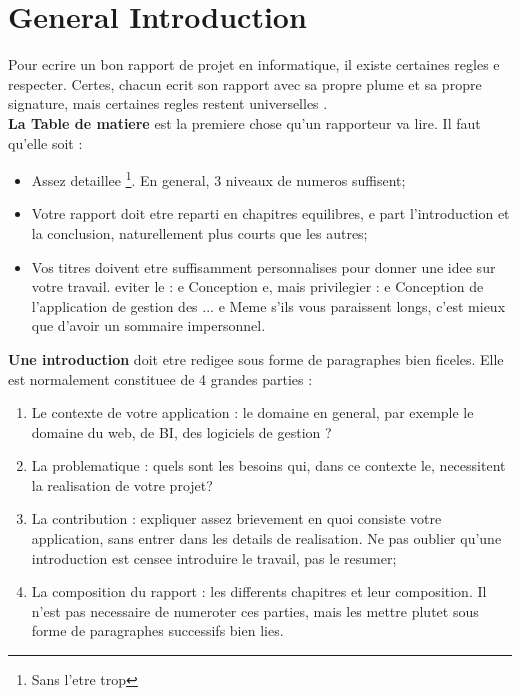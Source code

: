 \chapter*{General Introduction}

\begin{spacing}{1.2}

Pour ecrire un bon rapport \cite{SFAXI2015} de projet en informatique, il existe certaines regles e respecter. Certes, chacun ecrit son rapport avec sa propre plume et sa propre signature, mais certaines regles restent universelles    \cite{Latex}.\\

\textbf{La Table de matiere} est la premiere chose qu'un rapporteur va lire. Il faut qu'elle soit :
\begin{itemize}
\item Assez detaillee \footnote{Sans l'etre trop}. En general, 3 niveaux de numeros suffisent;
\item Votre rapport doit etre reparti en chapitres equilibres, e part l'introduction et la conclusion, naturellement plus courts que les autres;
\item Vos titres doivent etre suffisamment personnalises pour donner une idee sur votre travail. eviter le : e Conception e,  mais privilegier : e Conception de l'application de gestion des $...$ e Meme s'ils vous paraissent longs, c'est mieux que 
d'avoir un sommaire impersonnel. \\
\end{itemize}

\textbf{Une introduction} doit etre redigee sous forme de paragraphes bien ficeles. Elle est
normalement constituee de 4 grandes parties :
\begin{enumerate}
\item Le contexte de votre application : le domaine en general, par exemple le domaine du web, de BI, des logiciels de gestion ?
\item La problematique : quels sont les besoins qui, dans ce contexte le, necessitent la realisation de votre projet?
\item La contribution : expliquer assez brievement en quoi consiste votre application, sans entrer dans les details de realisation. Ne pas oublier qu'une introduction est
 censee introduire le travail, pas le resumer; 
 \item La composition du rapport : les differents chapitres et leur composition. Il n'est pas necessaire de numeroter ces parties, mais les mettre plutet sous forme de paragraphes successifs bien lies.
\end{enumerate}






\end{spacing}


